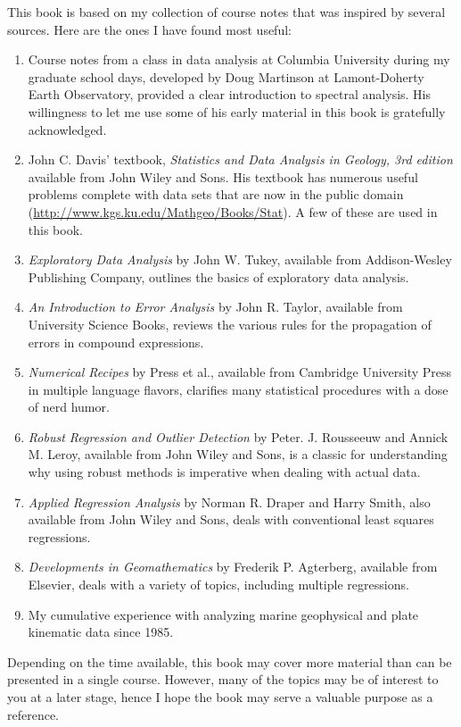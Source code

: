 This book is based on my collection of course notes that was inspired by several sources.  Here are the ones I have
found most useful:
\begin{enumerate}
\item Course notes from a class in data analysis at Columbia University during my graduate school days, developed by Doug Martinson
	   at Lamont-Doherty Earth Observatory, provided a clear introduction to spectral analysis.  His willingness to
	let me use some of his early material in this book is gratefully acknowledged.
\item John C. Davis' textbook, \emph{Statistics and Data Analysis in Geology, 3rd edition} available from John Wiley and Sons.
   His textbook has numerous useful problems complete with data sets that are now in the public domain
   (\url{http://www.kgs.ku.edu/Mathgeo/Books/Stat}). A few of these are used in this book.
\item \emph{Exploratory Data Analysis} by John W. Tukey, available from Addison-Wesley Publishing Company, outlines the basics
   of exploratory data analysis.
\item \emph{An Introduction to Error Analysis} by John R. Taylor, available from University Science Books, reviews the
   various rules for the propagation of errors in compound expressions.
\item \emph{Numerical Recipes} by Press et al., available from Cambridge University Press in multiple language flavors,
   clarifies many statistical procedures with a dose of nerd humor.
\item \emph{Robust Regression and Outlier Detection} by Peter. J. Rousseeuw and Annick M. Leroy, available from John Wiley and Sons, is a classic
   for understanding why using robust methods is imperative when dealing with actual data.
\item \emph{Applied Regression Analysis} by Norman R. Draper and Harry Smith, also available from John Wiley and Sons, deals with
   conventional least squares regressions.
\item \emph{Developments in Geomathematics} by Frederik P. Agterberg, available from Elsevier, deals with
   a variety of topics, including multiple regressions.
\item My cumulative experience with analyzing marine geophysical and plate kinematic data since 1985.
\end{enumerate}

Depending on the time available, this book may cover more material than can be presented in a single course.  However,
many of the topics may be of interest to you at a later stage, hence I hope the book may serve a valuable
purpose as a reference.

